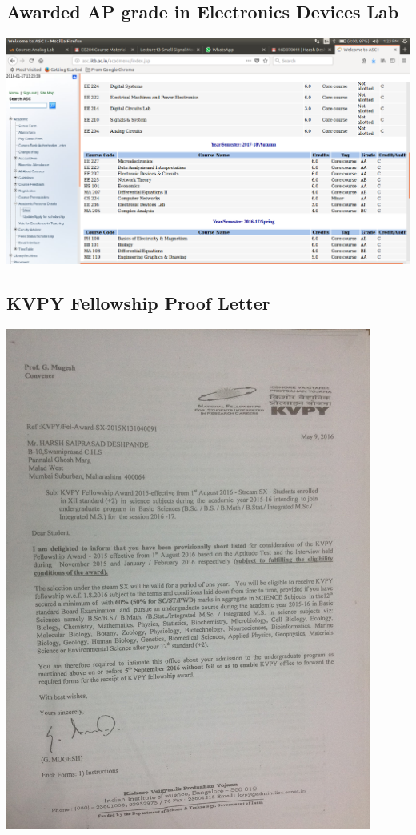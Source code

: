 \documentclass{article}
\begin{document}
    \subsection{Awarded AP grade in Electronics Devices Lab}
	\begin{center}
		\includegraphics[width = 1.1\textwidth]{Acads/ap_grade.png}{\centering}
	\end{center}
	\subsection{KVPY Fellowship Proof Letter}
	\begin{center}
		\includegraphics[width = 0.9\textwidth]{Acads/kvpy.jpeg}{\centering}
	\end{center}
\end{document}
